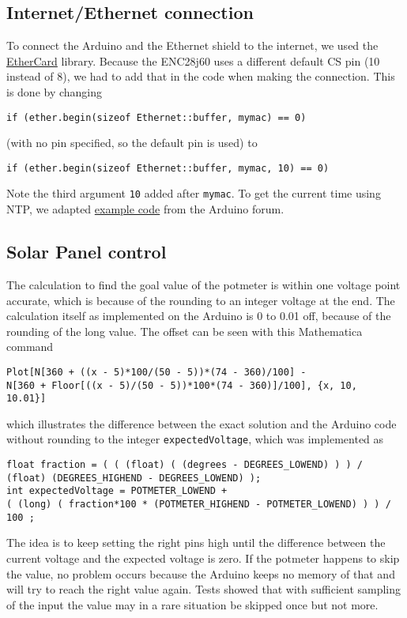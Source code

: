 		\subsection{Internet/Ethernet connection}\label{subsec:internet/ethernetConnection}
			To connect the Arduino and the Ethernet shield to the internet, we used the \href{https://github.com/jcw/ethercard}{EtherCard} library.
			Because the ENC28j60 uses a different default CS pin (10 instead of 8), we had to add that in the code when making the connection.
			This is done by changing
			\begin{lstlisting}
if (ether.begin(sizeof Ethernet::buffer, mymac) == 0)
			\end{lstlisting}
			(with no pin specified, so the default pin is used) to
			\begin{lstlisting}
if (ether.begin(sizeof Ethernet::buffer, mymac, 10) == 0)
			\end{lstlisting}
			Note the third argument \lstinline|10| added after \lstinline|mymac|.
			To get the current time using NTP, we adapted \href{http://forum.arduino.cc/index.php?topic=171941.0}{example code} from the Arduino forum.
		\subsection{Solar Panel control}\label{subsec:solarPanelControl}
			The calculation to find the goal value of the potmeter is within one voltage point accurate, which is because of the rounding to an integer voltage at the end.
			The calculation itself as implemented on the Arduino is 0 to 0.01 off, because of the rounding of the long value.
			 The offset can be seen with this Mathematica command
			\begin{lstlisting}
Plot[N[360 + ((x - 5)*100/(50 - 5))*(74 - 360)/100] - 
N[360 + Floor[((x - 5)/(50 - 5))*100*(74 - 360)]/100], {x, 10, 
10.01}]
			\end{lstlisting}
			which illustrates the difference between the exact solution and the Arduino code without rounding to the integer \verb|expectedVoltage|, which was implemented as 
			\begin{lstlisting}
float fraction = ( ( (float) ( (degrees - DEGREES_LOWEND) ) ) / (float) (DEGREES_HIGHEND - DEGREES_LOWEND) );
int expectedVoltage = POTMETER_LOWEND +
( (long) ( fraction*100 * (POTMETER_HIGHEND - POTMETER_LOWEND) ) ) / 100 ;
			\end{lstlisting}
			The idea is to keep setting the right pins high until the difference between the current voltage and the expected voltage is zero.
			If the potmeter happens to skip the value, no problem occurs because the Arduino keeps no memory of that and will try to reach the right value again.
			Tests showed that with sufficient sampling of the input the value may in a rare situation be skipped once but not more.

